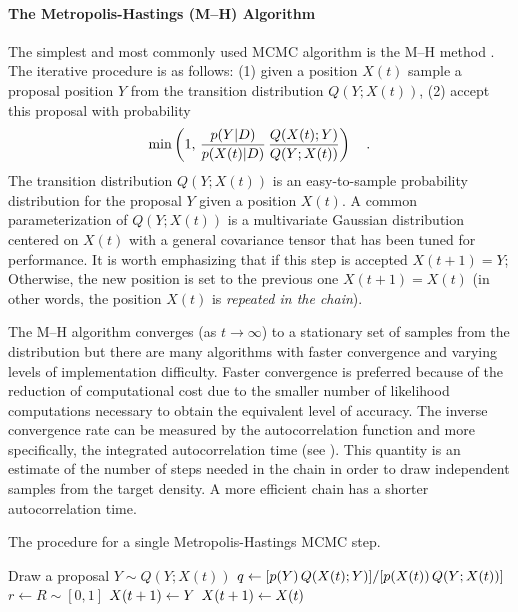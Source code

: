 \paragraph{The Metropolis-Hastings (M--H) Algorithm}

The simplest and most commonly used MCMC algorithm is the M--H method
\citep[;][]{MacKay:2003,Gregory:2005,Press:2007,Hogg:2010}.
The iterative procedure is as follows: (1) given a position
$X(t)$ sample a proposal position $Y$ from the transition distribution
$Q(Y; X(t))$, (2) accept this proposal with probability
\begin{equation}
    \mathrm{min} \left( 1,\,
            \frac{p(Y | D)}{p(X(t) | D)} \,
            \frac{Q(X(t); Y)}{ Q(Y;X(t))}  \right) \quad.
\end{equation}
The transition distribution $Q(Y; X(t))$ is an
easy-to-sample probability distribution for the proposal $Y$ given
a position $X(t)$.
A common parameterization of $Q(Y; X(t))$ is a multivariate Gaussian
distribution centered on $X(t)$ with a general covariance tensor that has
been tuned for performance.
It is worth emphasizing that if this step is accepted $X(t+1) = Y$; Otherwise,
the new position is set to the previous one $X(t+1) = X(t)$ (in other
words, the position $X(t)$ is \emph{repeated in the chain}).

The M--H algorithm converges (as $t \to \infty$) to a stationary set of
samples from the distribution but there are many algorithms with faster
convergence and varying levels of implementation difficulty.
Faster convergence is preferred because of the reduction of computational
cost due to the smaller number of likelihood computations necessary to obtain
the equivalent level of accuracy. The inverse convergence rate can be
measured by the autocorrelation function and more specifically, the integrated
autocorrelation time (see ). This quantity is an estimate of the
number of steps needed in the chain in order to draw independent samples from
the target density. A more efficient chain has a shorter
autocorrelation time.

\begin{algorithm}
\caption{The procedure for a single Metropolis-Hastings MCMC step.
    }
\begin{algorithmic}[1]

\STATE Draw a proposal $Y \sim Q (Y; X(t))$
\STATE $q \gets [p(Y) \, Q(X(t); Y)]
        / [p(X(t)) \, Q(Y;X(t))]$%
            \hspace{1cm}{\footnotesize\it // This line is generally expensive}
\STATE $r \gets R \sim [0, 1]$
    \STATE $X(t+1) \gets Y$
\ELSE
    \STATE $X(t+1) \gets X(t)$
\ENDIF

\end{algorithmic}
\end{algorithm}


